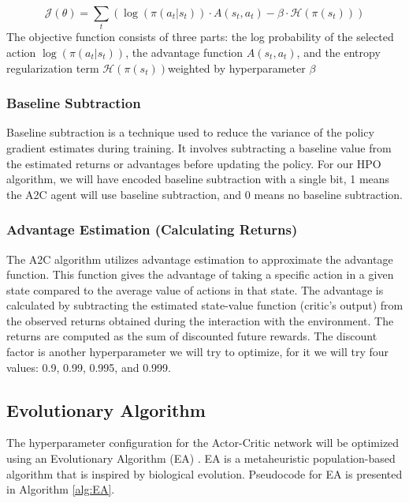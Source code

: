 \documentclass{article}
\begin{document}
\[
\mathcal{J}(\theta) = \sum_{t} \left( \log(\pi(a_t|s_t)) \cdot A(s_t, a_t) - \beta \cdot \mathcal{H}(\pi(s_t)) \right)
\]
The objective function consists of three parts: the log probability of the selected action $\log(\pi(a_t|s_t))$, the advantage function $A(s_t, a_t)$, and the entropy regularization term $\mathcal{H}(\pi(s_t))$weighted by hyperparameter $\beta$

\subsubsection{Baseline Subtraction}
\label{sssec:blsub}

Baseline subtraction is a technique used to reduce the variance of the policy gradient estimates during training.
It involves subtracting a baseline value from the estimated returns or advantages before updating the policy.
For our HPO algorithm, we will have encoded baseline subtraction with a single bit, 1 means the A2C agent will use baseline subtraction, and 0 means no baseline subtraction.

\subsubsection{Advantage Estimation (Calculating Returns)}
\label{sssec:advest}

The A2C algorithm utilizes advantage estimation to approximate the advantage function.
This function gives the advantage of taking a specific action in a given state compared to the average value of actions in that state.
The advantage is calculated by subtracting the estimated state-value function (critic's output) from the observed returns obtained during the interaction with the environment.
The returns are computed as the sum of discounted future rewards. 
The discount factor is another hyperparameter we will try to optimize, for it we will try four values: 0.9, 0.99, 0.995, and 0.999.


\subsection{Evolutionary Algorithm}
\label{ssec:EA}

The hyperparameter configuration for the Actor-Critic network will be optimized using an Evolutionary Algorithm (EA) \cite{Simon2013EvolutionaryOA}.
EA is a metaheuristic population-based algorithm that is inspired by biological evolution.
Pseudocode for EA is presented in Algorithm \ref{alg:EA}.
\end{document}
